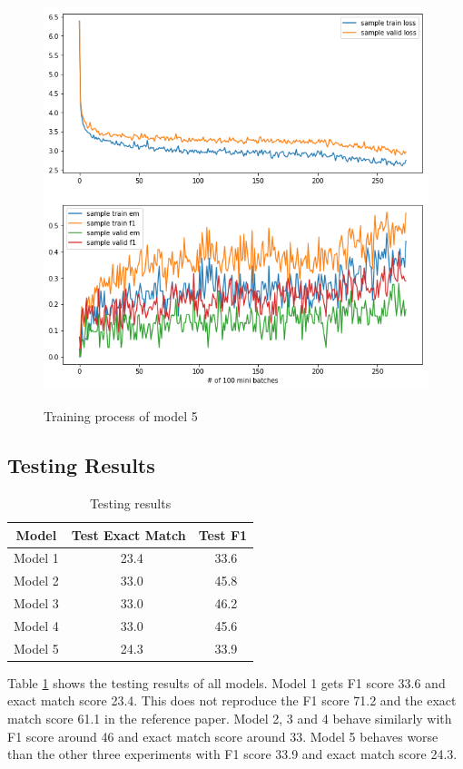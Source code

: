 \documentclass[modernstyle,12pt]{sjsuthesis}
\theoremstyle{definition}
\begin{document}
\begin{figure}[htbp]\centering
  \includegraphics[width=12cm, height=12cm]{figures/match_change3.png}
  \caption{Training process of model 5}
  \label{f:baseline_change3}
\end{figure}

\subsection{Testing Results}

\begin{table}[htbp]\centering
  \caption{Testing results}
  \label{tab:test_results}
  \begin{tabular}{|c|c|c|}
    \hline
    Model& Test Exact Match & Test F1 \\
    \hline\hline
    Model 1 & \ 23.4 &\ 33.6 \\
    Model 2 & \ 33.0 &\ 45.8 \\
    Model 3 & \ 33.0 &\ 46.2 \\
    Model 4 & \ 33.0 &\ 45.6 \\
    Model 5 & \ 24.3 &\ 33.9 \\
    \hline
  \end{tabular}
\end{table}

Table \ref{tab:test_results} shows the testing results of all models. Model 1 gets F1 score 33.6 and exact match score 23.4. This does not reproduce the F1 score 71.2 and the exact match score 61.1 in the reference paper\cite{wang2016machine}. Model 2, 3 and 4 behave similarly with F1 score around 46 and exact match score around 33. Model 5 behaves worse than the other three experiments with F1 score 33.9 and exact match score 24.3.
\end{document}
